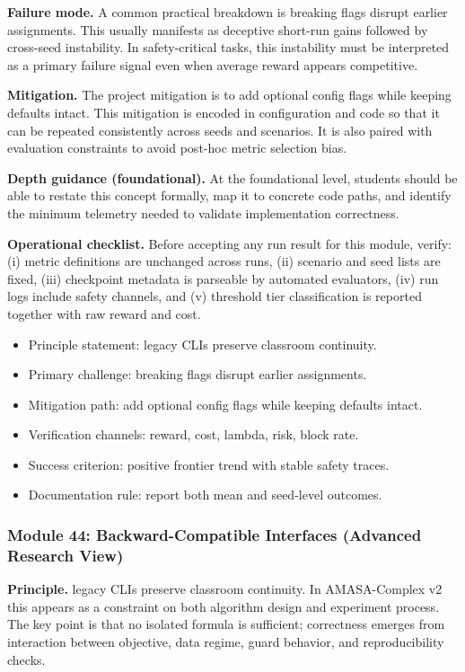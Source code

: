 \documentclass[conference]{IEEEtran}
\begin{document}
\textbf{Failure mode.} A common practical breakdown is breaking flags disrupt earlier assignments. This usually manifests as deceptive short-run gains followed by cross-seed instability. In safety-critical tasks, this instability must be interpreted as a primary failure signal even when average reward appears competitive.

\textbf{Mitigation.} The project mitigation is to add optional config flags while keeping defaults intact. This mitigation is encoded in configuration and code so that it can be repeated consistently across seeds and scenarios. It is also paired with evaluation constraints to avoid post-hoc metric selection bias.

\textbf{Depth guidance (foundational).} At the foundational level, students should be able to restate this concept formally, map it to concrete code paths, and identify the minimum telemetry needed to validate implementation correctness.

\textbf{Operational checklist.} Before accepting any run result for this module, verify: (i) metric definitions are unchanged across runs, (ii) scenario and seed lists are fixed, (iii) checkpoint metadata is parseable by automated evaluators, (iv) run logs include safety channels, and (v) threshold tier classification is reported together with raw reward and cost.

\begin{itemize}[leftmargin=*]
  \item Principle statement: legacy CLIs preserve classroom continuity.
  \item Primary challenge: breaking flags disrupt earlier assignments.
  \item Mitigation path: add optional config flags while keeping defaults intact.
  \item Verification channels: reward, cost, lambda, risk, block rate.
  \item Success criterion: positive frontier trend with stable safety traces.
  \item Documentation rule: report both mean and seed-level outcomes.
\end{itemize}


\subsubsection{Module 44: Backward-Compatible Interfaces (Advanced Research View)}
\textbf{Principle.} legacy CLIs preserve classroom continuity. In AMASA-Complex v2 this appears as a constraint on both algorithm design and experiment process. The key point is that no isolated formula is sufficient; correctness emerges from interaction between objective, data regime, guard behavior, and reproducibility checks.
\end{document}
